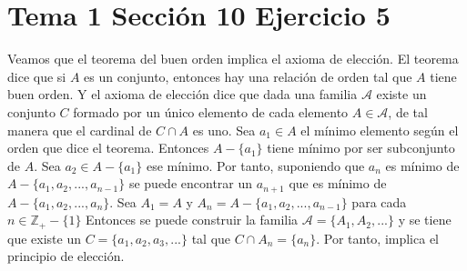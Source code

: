 \documentclass{article}
\begin{document}
\section{Tema 1 Sección 10 Ejercicio 5}
Veamos que el teorema del buen orden implica el axioma de elección. El teorema dice que si $A$ es un conjunto, entonces hay una relación de orden tal que $A$ tiene buen orden. Y el axioma de elección dice que dada una familia $\mathcal{A}$ existe un conjunto $C$ formado por un único elemento de cada elemento $A\in \mathcal{A}$, de tal manera que el cardinal de $C\cap A$ es uno. Sea $a_1\in A$ el mínimo elemento según el orden que dice el teorema. Entonces $A-\{a_1\}$ tiene mínimo por ser subconjunto de $A$. Sea $a_2\in A-\{a_1\}$ ese mínimo. Por tanto, suponiendo que $a_n$ es mínimo de $A-\{a_1,a_2,...,a_{n-1}\}$ se puede encontrar un $a_{n+1}$ que es mínimo de $A-\{a_1,a_2,...,a_{n}\}$. Sea $A_1=A$ y $A_n=A-\{a_1,a_2,...,a_{n-1}\}$ para cada  $n\in \mathbb{Z}_{+}-\{1\}$ Entonces se puede construir la familia  $\mathcal{A}=\{A_1,A_2,...\}$ y se tiene que existe un $C=\{a_1,a_2, a_3,...\}$ tal que $C\cap A_n=\{a_n\}$. 
Por tanto, implica el principio de elección.
  
\end{document}
